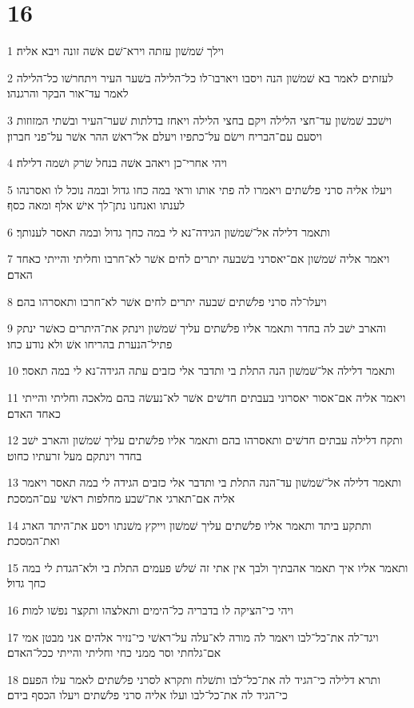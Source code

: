 \chapter{16}

\par 1 וילך שׁמשׁון עזתה וירא־שׁם אשׁה זונה ויבא אליה׃
\par 2 לעזתים לאמר בא שׁמשׁון הנה ויסבו ויארבו־לו כל־הלילה בשׁער העיר ויתחרשׁו כל־הלילה לאמר עד־אור הבקר והרגנהו׃
\par 3 וישׁכב שׁמשׁון עד־חצי הלילה ויקם בחצי הלילה ויאחז בדלתות שׁער־העיר ובשׁתי המזוזות ויסעם עם־הבריח וישׂם על־כתפיו ויעלם אל־ראשׁ ההר אשׁר על־פני חברון׃
\par 4 ויהי אחרי־כן ויאהב אשׁה בנחל שׂרק ושׁמה דלילה׃
\par 5 ויעלו אליה סרני פלשׁתים ויאמרו לה פתי אותו וראי במה כחו גדול ובמה נוכל לו ואסרנהו לענתו ואנחנו נתן־לך אישׁ אלף ומאה כסף׃
\par 6 ותאמר דלילה אל־שׁמשׁון הגידה־נא לי במה כחך גדול ובמה תאסר לענותך׃
\par 7 ויאמר אליה שׁמשׁון אם־יאסרני בשׁבעה יתרים לחים אשׁר לא־חרבו וחליתי והייתי כאחד האדם׃
\par 8 ויעלו־לה סרני פלשׁתים שׁבעה יתרים לחים אשׁר לא־חרבו ותאסרהו בהם׃
\par 9 והארב ישׁב לה בחדר ותאמר אליו פלשׁתים עליך שׁמשׁון וינתק את־היתרים כאשׁר ינתק פתיל־הנערת בהריחו אשׁ ולא נודע כחו׃
\par 10 ותאמר דלילה אל־שׁמשׁון הנה התלת בי ותדבר אלי כזבים עתה הגידה־נא לי במה תאסר׃
\par 11 ויאמר אליה אם־אסור יאסרוני בעבתים חדשׁים אשׁר לא־נעשׂה בהם מלאכה וחליתי והייתי כאחד האדם׃
\par 12 ותקח דלילה עבתים חדשׁים ותאסרהו בהם ותאמר אליו פלשׁתים עליך שׁמשׁון והארב ישׁב בחדר וינתקם מעל זרעתיו כחוט׃
\par 13 ותאמר דלילה אל־שׁמשׁון עד־הנה התלת בי ותדבר אלי כזבים הגידה לי במה תאסר ויאמר אליה אם־תארגי את־שׁבע מחלפות ראשׁי עם־המסכת׃
\par 14 ותתקע ביתד ותאמר אליו פלשׁתים עליך שׁמשׁון וייקץ משׁנתו ויסע את־היתד הארג ואת־המסכת׃
\par 15 ותאמר אליו איך תאמר אהבתיך ולבך אין אתי זה שׁלשׁ פעמים התלת בי ולא־הגדת לי במה כחך גדול׃
\par 16 ויהי כי־הציקה לו בדבריה כל־הימים ותאלצהו ותקצר נפשׁו למות׃
\par 17 ויגד־לה את־כל־לבו ויאמר לה מורה לא־עלה על־ראשׁי כי־נזיר אלהים אני מבטן אמי אם־גלחתי וסר ממני כחי וחליתי והייתי ככל־האדם׃
\par 18 ותרא דלילה כי־הגיד לה את־כל־לבו ותשׁלח ותקרא לסרני פלשׁתים לאמר עלו הפעם כי־הגיד לה את־כל־לבו ועלו אליה סרני פלשׁתים ויעלו הכסף בידם׃
